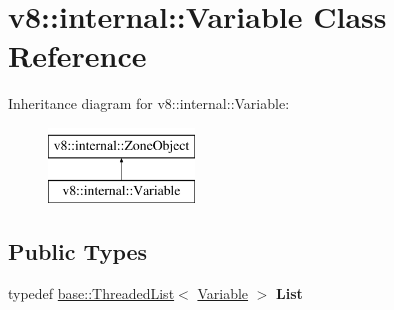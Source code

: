 \hypertarget{classv8_1_1internal_1_1Variable}{}\section{v8\+:\+:internal\+:\+:Variable Class Reference}
\label{classv8_1_1internal_1_1Variable}
Inheritance diagram for v8\+:\+:internal\+:\+:Variable\+:\begin{figure}[H]
\begin{center}
\leavevmode
\includegraphics[height=2.000000cm]{classv8_1_1internal_1_1Variable}
\end{center}
\end{figure}
\subsection*{Public Types}
\begin{DoxyCompactItemize}
\item 
\mbox{\label{classv8_1_1internal_1_1Variable_a82f327564aa40218153ee76e60478605}} 
typedef \mbox{\hyperlink{classv8_1_1base_1_1ThreadedListBase}{base\+::\+Threaded\+List}}$<$ \mbox{\hyperlink{classv8_1_1internal_1_1Variable}{Variable}} $>$ {\bfseries List}
\end{DoxyCompactItemize}
